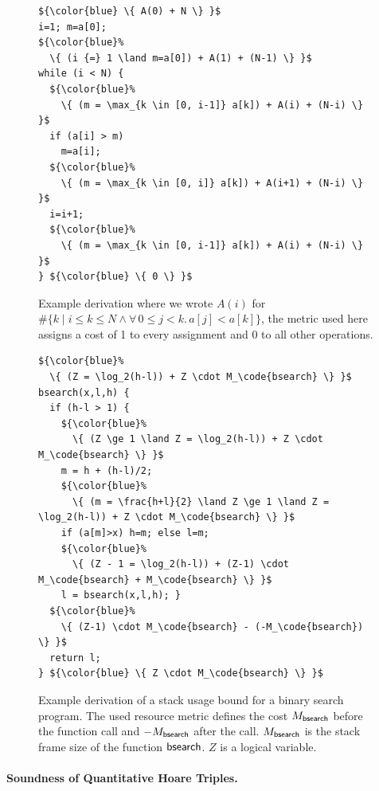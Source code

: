 \documentclass[nocopyrightspace,preprint,pldi]{sigplanconf-pldi15}
\begin{document}
{\begin{figure}
\begin{lstlisting}
${\color{blue} \{ A(0) + N \} }$
i=1; m=a[0];
${\color{blue}%
  \{ (i {=} 1 \land m=a[0]) + A(1) + (N-1) \} }$
while (i < N) {
  ${\color{blue}%
    \{ (m = \max_{k \in [0, i-1]} a[k]) + A(i) + (N-i) \} }$
  if (a[i] > m)
    m=a[i];
  ${\color{blue}%
    \{ (m = \max_{k \in [0, i]} a[k]) + A(i+1) + (N-i) \} }$
  i=i+1;
  ${\color{blue}%
    \{ (m = \max_{k \in [0, i-1]} a[k]) + A(i) + (N-i) \} }$
} ${\color{blue} \{ 0 \} }$
\end{lstlisting}
\caption{Example derivation where we wrote $A(i)$
  for $\#\{ k \mid i \le k \le N \land \forall\, 0\le j<k.\, a[j] < a[k]\}$,
  the metric used here assigns a cost of 1 to every assignment
  and 0 to all other operations.
  }
\label{fig:xmplmax}
\end{figure}

\begin{figure}
\begin{lstlisting}
${\color{blue}%
  \{ (Z = \log_2(h-l)) + Z \cdot M_\code{bsearch} \} }$
bsearch(x,l,h) {
  if (h-l > 1) {
    ${\color{blue}%
      \{ (Z \ge 1 \land Z = \log_2(h-l)) + Z \cdot M_\code{bsearch} \} }$
    m = h + (h-l)/2;
    ${\color{blue}%
      \{ (m = \frac{h+l}{2} \land Z \ge 1 \land Z = \log_2(h-l)) + Z \cdot M_\code{bsearch} \} }$
    if (a[m]>x) h=m; else l=m;
    ${\color{blue}%
      \{ (Z - 1 = \log_2(h-l)) + (Z-1) \cdot M_\code{bsearch} + M_\code{bsearch} \} }$
    l = bsearch(x,l,h); }
  ${\color{blue}%
    \{ (Z-1) \cdot M_\code{bsearch} - (-M_\code{bsearch}) \} }$
  return l;
} ${\color{blue} \{ Z \cdot M_\code{bsearch} \} }$
\end{lstlisting}
\caption{Example derivation of a stack usage bound for a binary
  search program.  The used resource metric defines the cost $M_{\mathsf{bsearch}}$ before
  the function call and $-M_{\mathsf{bsearch}}$ after the call.  $M_{\mathsf{bsearch}}$ is the stack
  frame size of the function $\mathsf{bsearch}$.  $Z$ is a
  logical variable.
  }
\label{fig:xmplbs}
\end{figure}


\paragraph{Soundness of Quantitative Hoare Triples.}

}
\end{document}
